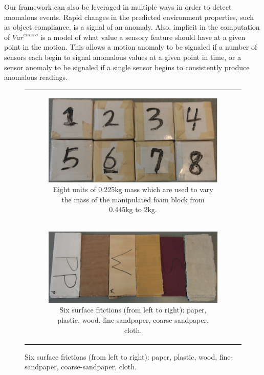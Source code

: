 Our framework can also be leveraged in multiple ways in order to detect anomalous events.
Rapid changes in the predicted environment properties, such as object compliance, is a signal of an anomaly.
Also, implicit in the computation of $\mathit{Var}^{enviro}$ is a model of what value a sensory feature should have at a given point in the motion.
This allows a motion anomaly to be signaled if a number of sensors each begin to signal anomalous values at a given point in time, or a sensor anomaly to be signaled if a single sensor begins to consistently produce anomalous readings.

\begin{figure}[]
    \begin{tabular}{c}
        \begin{subfigure}[]{1\linewidth}
            \includegraphics[width=\linewidth]{images/setup_m}
            \caption{Eight units of 0.225kg mass which are used to vary the mass of the manipulated foam block from 0.445kg to 2kg.}
        \end{subfigure} \\
        \begin{subfigure}[]{1\linewidth}
            \includegraphics[width=\linewidth]{images/setup_f}
            \caption{Six surface frictions (from left to right): paper, plastic, wood, fine-sandpaper, coarse-sandpaper, cloth.}

\end{subfigure}
\end{tabular}
\end{figure}
